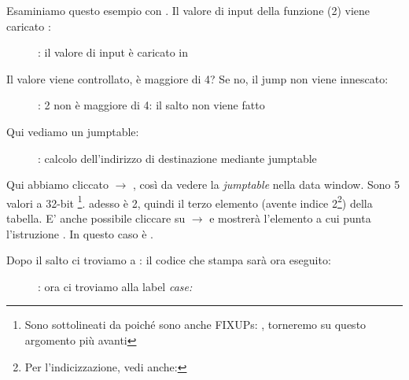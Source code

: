 \clearpage
\mysubparagraph{\olly}
\myindex{\olly}

Esaminiamo questo esempio con \olly.
Il valore di input della funzione (2) viene caricato \EAX: 

\begin{figure}[H]
\centering
{}
\caption{\olly: il valore di input è caricato in \EAX}
\label{fig:switch_lot_olly1}
\end{figure}

\clearpage
Il valore viene controllato, è maggiore di 4?
Se no, il  jump non viene innescato:
\begin{figure}[H]
\centering
{}
\caption{\olly: 2 non è maggiore di 4: il salto non viene fatto}
\label{fig:switch_lot_olly2}
\end{figure}

\clearpage
Qui vediamo un jumptable:

\begin{figure}[H]
\centering
{}
\caption{\olly: calcolo dell'indirizzo di destinazione mediante jumptable}
\label{fig:switch_lot_olly3}
\end{figure}

Qui abbiamo cliccato  $\rightarrow$ , così da vedere la \emph{jumptable} nella data window.
Sono 5 valori a 32-bit \footnote{Sono sottolineati da \olly poiché
sono anche FIXUPs: , torneremo su questo argomento più avanti}.
\ECX adesso è 2, quindi il terzo elemento (avente indice 2\footnote{Per l'indicizzazione, vedi anche: }) della tabella.
E' anche possibile cliccare su  $\rightarrow$ 
 e \olly mostrerà l'elemento a cui punta l'istruzione \JMP. 
In questo caso è .

\clearpage
Dopo il salto ci troviamo a : il codice che stampa  sarà ora eseguito:

\begin{figure}[H]
\centering
{}
\caption{\olly: ora ci troviamo alla label \emph{case:}}
\label{fig:switch_lot_olly4}
\end{figure}
